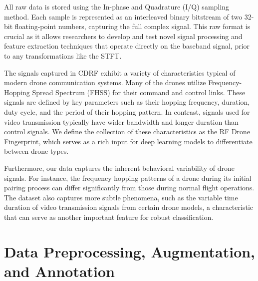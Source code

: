 All raw data is stored using the In-phase and Quadrature (I/Q) sampling method. Each sample is represented as an interleaved binary bitstream of two 32-bit floating-point numbers, capturing the full complex signal. This raw format is crucial as it allows researchers to develop and test novel signal processing and feature extraction techniques that operate directly on the baseband signal, prior to any transformations like the STFT.

The signals captured in CDRF exhibit a variety of characteristics typical of modern drone communication systems. Many of the drones utilize Frequency-Hopping Spread Spectrum (FHSS) for their command and control links. These signals are defined by key parameters such as their hopping frequency, duration, duty cycle, and the period of their hopping pattern. In contrast, signals used for video transmission typically have wider bandwidth and longer duration than control signals. We define the collection of these characteristics as the RF Drone Fingerprint, which serves as a rich input for deep learning models to differentiate between drone types.

Furthermore, our data captures the inherent behavioral variability of drone signals. For instance, the frequency hopping patterns of a drone during its initial pairing process can differ significantly from those during normal flight operations. The dataset also captures more subtle phenomena, such as the variable time duration of video transmission signals from certain drone models, a characteristic that can serve as another important feature for robust classification.


\section{Data Preprocessing, Augmentation, and Annotation}
\label{sec:data_processing}

